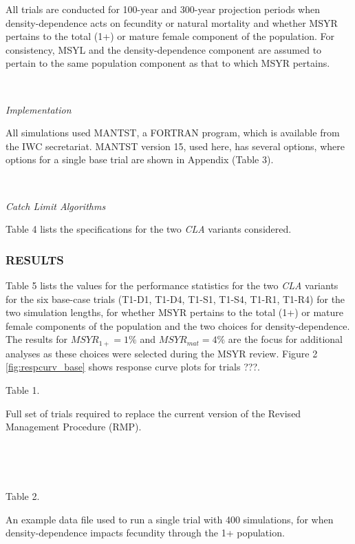 \documentclass[]{article}
\begin{document}
All trials are conducted for 100-year and 300-year projection periods
when density-dependence acts on fecundity or natural mortality
\autocite{johnson_2015_iwc1} and whether MSYR pertains to the total (1+)
or mature female component of the population. For consistency, MSYL and
the density-dependence component are assumed to pertain to the same population
component as that to which MSYR pertains.

~

\emph{Implementation}

All simulations used MANTST, a FORTRAN program, which is available from
the IWC secretariat. MANTST version 15, used here, has several options,
where options for a single base trial are shown in Appendix (Table 3).

~

\emph{Catch Limit Algorithms}

Table 4 lists the specifications for the two \emph{CLA} variants
considered.

\subsubsection{RESULTS}\label{results}

Table 5 lists the values for the performance statistics for the two
\emph{CLA} variants for the six base-case trials (T1-D1, T1-D4, T1-S1,
T1-S4, T1-R1, T1-R4) for the two simulation lengths, for whether MSYR
pertains to the total (1+) or mature female components of the population
and the two choices for density-dependence. The results for
$MSYR_{1+}=1\%$ and $MSYR_{mat}=4\%$ are the focus for additional
analyses as these choices were selected during the MSYR review.
Figure 2 \ref{fig:respcurv_base} shows response curve plots for trials ???.


\begin{center}
Table 1.

Full set of trials required to replace the current version of
the Revised Management Procedure (RMP).
\end{center}

~



~

\begin{center}
Table 2.

An example data file used to run a single trial with 400 simulations,
for when density-dependence impacts fecundity through the 1+ population.
\end{center}
\end{document}
